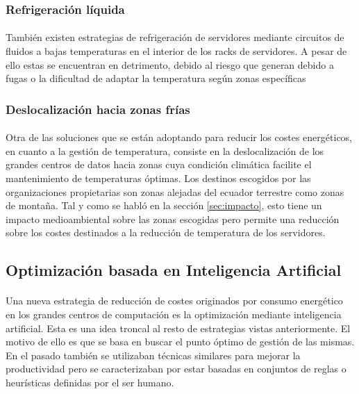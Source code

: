 \documentclass[12pt]{article}
\begin{document}
			\subsubsection{Refrigeración líquida}

				\paragraph{}
				También existen estrategias de refrigeración de servidores mediante circuitos de fluidos a bajas temperaturas en el interior de los racks de servidores. A pesar de ello estas se encuentran en detrimento, debido al riesgo que generan debido a fugas o la dificultad de adaptar la temperatura según zonas específicas

			\subsubsection{Deslocalización hacia zonas frías}

				\paragraph{}
				Otra de las soluciones que se están adoptando para reducir los costes energéticos, en cuanto a la gestión de temperatura, consiste en la deslocalización de los grandes centros de datos hacia zonas cuya condición climática facilite el mantenimiento de temperaturas óptimas. Los destinos escogidos por las organizaciones propietarias son zonas alejadas del ecuador terrestre como zonas de montaña. Tal y como se habló en la sección \ref{sec:impacto}, esto tiene un impacto medioambiental sobre las zonas escogidas pero permite una reducción sobre los costes destinados a la reducción de temperatura de los servidores.

		\subsection{Optimización basada en Inteligencia Artificial}

			\paragraph{}
			Una nueva estrategia de reducción de costes originados por consumo energético en los grandes centros de computación es la optimización mediante inteligencia artificial. Esta es una idea troncal al resto de estrategias vistas anteriormente. El motivo de ello es que se basa en buscar el punto óptimo de gestión de las mismas. En el pasado también se utilizaban técnicas similares para mejorar la productividad pero se caracterizaban por estar basadas en conjuntos de reglas o heurísticas definidas por el ser humano.
\end{document}
